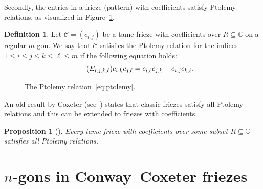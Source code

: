 \documentclass[10pt]{amsart}
\numberwithin{equation}{section}
\newtheorem{prop}[theo]{Proposition}
\theoremstyle{definition}
\newtheorem{defi}[theo]{Definition}
\theoremstyle{remark}
\begin{document}
Secondly, 
the entries in a frieze (pattern) with coefficients satisfy Ptolemy relations,
as visualized in Figure~\ref{fig:Ptolemy}.

\begin{defi} \label{def:ptolemy}
Let $\mathcal{C}=(c_{i,j})$ be a tame frieze with coefficients over $R\subseteq \mathbb{C}$
on a regular $m$-gon. We say that $\mathcal{C}$ satisfies the Ptolemy relation for 
the indices $1\le i\le j\le k\le \ell\le m$ if the following equation holds:
\begin{equation*}\tag{$E_{i,j,k,\ell}$}\label{eq:ptolemy}
c_{i,k} c_{j,\ell} = c_{i,\ell} c_{j,k} + c_{i,j} c_{k,\ell}.
\end{equation*}
\end{defi}


\begin{figure}[htb]\centering
 \caption{The Ptolemy relation~\eqref{eq:ptolemy}. 
 \label{fig:Ptolemy}}
\end{figure}



An old result by Coxeter (see~\cite[Equation~(5.7)]{Cox71})
states that classic friezes satisfy all Ptolemy relations and this can be extended 
to friezes with coefficients. 



\begin{prop}[{\cite[Theorem~2.6]{CHJ}}] \label{thm:ptolemy}
Every tame frieze with coefficients
over some subset $R\subseteq \mathbb{C}$
satisfies all Ptolemy relations.
\end{prop}


\section{\texorpdfstring{$n$}{n}-gons in Conway--Coxeter friezes}
\label{sec:ngons}
\end{document}
